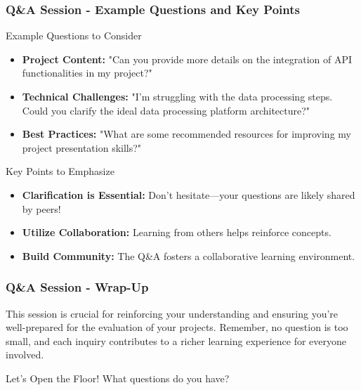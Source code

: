 \documentclass[aspectratio=169]{beamer}
\begin{document}
\begin{frame}[fragile]
    \frametitle{Q\&A Session - Example Questions and Key Points}
    \begin{block}{Example Questions to Consider}
        \begin{itemize}
            \item \textbf{Project Content:} "Can you provide more details on the integration of API functionalities in my project?"
            \item \textbf{Technical Challenges:} "I’m struggling with the data processing steps. Could you clarify the ideal data processing platform architecture?"
            \item \textbf{Best Practices:} "What are some recommended resources for improving my project presentation skills?"
        \end{itemize}
    \end{block}

    \begin{block}{Key Points to Emphasize}
        \begin{itemize}
            \item \textbf{Clarification is Essential:} Don’t hesitate—your questions are likely shared by peers!
            \item \textbf{Utilize Collaboration:} Learning from others helps reinforce concepts.
            \item \textbf{Build Community:} The Q\&A fosters a collaborative learning environment.
        \end{itemize}
    \end{block}
\end{frame}

\begin{frame}[fragile]
    \frametitle{Q\&A Session - Wrap-Up}
    This session is crucial for reinforcing your understanding and ensuring you're well-prepared for the evaluation of your projects. Remember, no question is too small, and each inquiry contributes to a richer learning experience for everyone involved. 

    \begin{block}{Let's Open the Floor!}
        What questions do you have?
    \end{block}
\end{frame}
\end{document}
